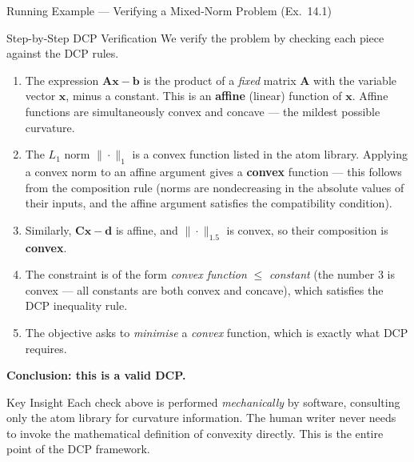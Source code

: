 \documentclass[aspectratio=169,10pt]{beamer}
\begin{document}
\begin{frame}[allowframebreaks]{Running Example --- Verifying a Mixed-Norm Problem (Ex.\ 14.1)}
  \begin{block}{Step-by-Step DCP Verification}
    We verify the problem by checking each piece against the DCP rules.
    \begin{enumerate}
      \item The expression $\mathbf{A}\mathbf{x} - \mathbf{b}$ is the
            product of a \emph{fixed} matrix $\mathbf{A}$ with the
            variable vector $\mathbf{x}$, minus a constant.  This is an
            \textbf{affine} (linear) function of $\mathbf{x}$.  Affine
            functions are simultaneously convex and concave --- the
            mildest possible curvature.
      \item The $L_1$ norm $\|\cdot\|_1$ is a convex function listed
            in the atom library.  Applying a convex norm to an affine
            argument gives a \textbf{convex} function --- this follows
            from the composition rule (norms are nondecreasing in the
            absolute values of their inputs, and the affine argument
            satisfies the compatibility condition).
      \item Similarly, $\mathbf{C}\mathbf{x} - \mathbf{d}$ is affine,
            and $\|\cdot\|_{1.5}$ is convex, so their composition is
            \textbf{convex}.
      \item The constraint is of the form \emph{convex function}
            $\leq$ \emph{constant} (the number 3 is convex --- all
            constants are both convex and concave), which satisfies
            the DCP inequality rule.
      \item The objective asks to \emph{minimise} a \emph{convex}
            function, which is exactly what DCP requires.
    \end{enumerate}
    \textcolor{dcpgreen}{\textbf{Conclusion: this is a valid DCP.}}
  \end{block}

  \begin{alertblock}{Key Insight}
    Each check above is performed \emph{mechanically} by software,
    consulting only the atom library for curvature information.  The
    human writer never needs to invoke the mathematical definition of
    convexity directly.  This is the entire point of the DCP framework.
  \end{alertblock}

\end{frame}
\end{document}
